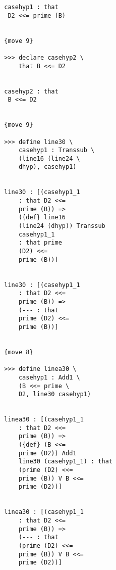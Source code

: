 \documentclass[12pt]{article}
\begin{document}
\begin{verbatim}
                           casehyp1 : that 
                            D2 <<= prime (B)


                           {move 9}

                           >>> declare casehyp2 \
                               that B <<= D2


                           casehyp2 : that 
                            B <<= D2


                           {move 9}

                           >>> define line30 \
                               casehyp1 : Transsub \
                               (line16 (line24 \
                               dhyp), casehyp1)


                           line30 : [(casehyp1_1 
                               : that D2 <<= 
                               prime (B)) => 
                               ({def} line16 
                               (line24 (dhyp)) Transsub 
                               casehyp1_1 
                               : that prime 
                               (D2) <<= 
                               prime (B))]


                           line30 : [(casehyp1_1 
                               : that D2 <<= 
                               prime (B)) => 
                               (--- : that 
                               prime (D2) <<= 
                               prime (B))]


                           {move 8}

                           >>> define linea30 \
                               casehyp1 : Add1 \
                               (B <<= prime \
                               D2, line30 casehyp1)


                           linea30 : [(casehyp1_1 
                               : that D2 <<= 
                               prime (B)) => 
                               ({def} (B <<= 
                               prime (D2)) Add1 
                               line30 (casehyp1_1) : that 
                               (prime (D2) <<= 
                               prime (B)) V B <<= 
                               prime (D2))]


                           linea30 : [(casehyp1_1 
                               : that D2 <<= 
                               prime (B)) => 
                               (--- : that 
                               (prime (D2) <<= 
                               prime (B)) V B <<= 
                               prime (D2))]



\end{verbatim}
\end{document}
